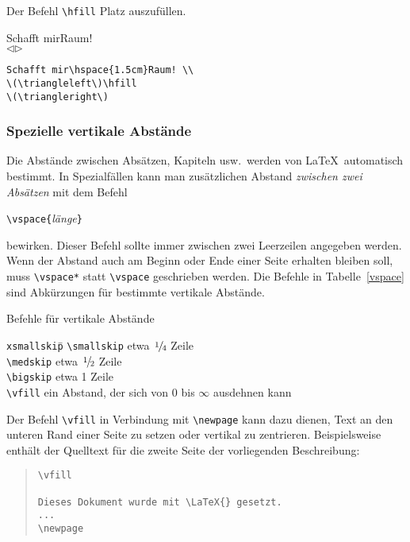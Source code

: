 Der Befehl \verb|\hfill|
Platz auszufüllen.
\exa
\raggedright
Schafft mir\hspace{1.5cm}Raum! \\
\(\triangleleft\)\hfill \(\triangleright\)\\
\exb
\begin{verbatim}
Schafft mir\hspace{1.5cm}Raum! \\
\(\triangleleft\)\hfill 
\(\triangleright\)
\end{verbatim}
\exc


\subsubsection{Spezielle vertikale Abstände} \label{vabstaende}
 
Die Abstände zwischen Absätzen, Kapiteln usw.\ werden von
\LaTeX\ automatisch bestimmt.
In Spezialfällen kann man zusätzlichen Abstand
\emph{zwischen zwei Absätzen} mit dem Befehl
\begin{beispiel}
\verb|\vspace{|\textit{länge}\verb|}|
\end{beispiel}
bewirken.
Dieser Befehl sollte immer zwischen zwei Leerzeilen angegeben
werden.
Wenn der Abstand auch am Beginn oder Ende einer Seite erhalten
bleiben soll, muss \verb|\vspace*| statt \verb|\vspace|
geschrieben werden.
Die Befehle in Tabelle~\ref{vspace} sind Abkürzungen für
bestimmte vertikale Abstände.
\begin{table}[t]
\caption{Befehle für vertikale Abstände} \label{vspace}
\begin{lminipage}{13cm}
\begin{tabbing}
\texttt{xsmallskip}\qquad \= \kill
\verb|\smallskip| \> etwa \(\nfrac{1}{4}\) Zeile \\
\verb|\medskip|   \> etwa \(\nfrac{1}{2}\) Zeile \\
\verb|\bigskip|   \> etwa 1 Zeile \\
\verb|\vfill|     \> ein Abstand, der sich von 0 bis \(\infty\)
                     ausdehnen kann
\end{tabbing}
\end{lminipage}
\end{table}
Der Befehl \verb|\vfill|  in Verbindung mit \verb|\newpage|
kann dazu dienen, Text an den unteren Rand einer Seite zu setzen
oder vertikal zu zentrieren.  Beispielsweise enthält der Quelltext
für die zweite Seite der vorliegenden Beschreibung:
\begin{quote}
\begin{verbatim}
\vfill

Dieses Dokument wurde mit \LaTeX{} gesetzt.
...
\newpage
\end{verbatim}
\end{quote}
 
